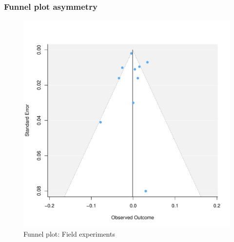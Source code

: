 \documentclass[usenames,dvipsnames]{beamer}
\begin{document}
\begin{frame}[label=supplemental]
\frametitle{Funnel plot asymmetry}

\begin{figure}[!hb]
\vspace*{-3mm}
\includegraphics[scale = 0.45]{../figs/funnel_re_field.pdf}
\vspace{-0.2cm}
\caption{Funnel plot: Field experiments}
\small
\vspace{-0.5cm}
\label{fig: funnel_all}
\end{figure}
\end{frame}

\end{document}
